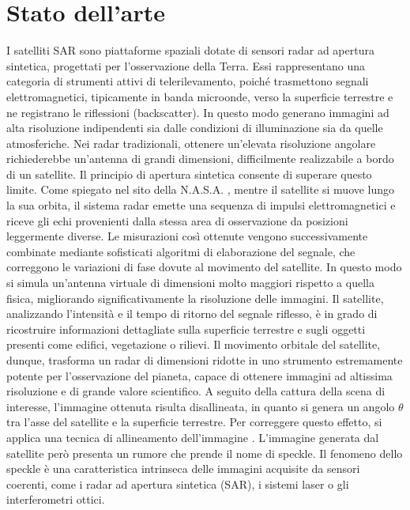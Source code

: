 \chapter{Stato dell'arte}
I satelliti SAR sono piattaforme spaziali dotate di sensori radar ad apertura sintetica, 
progettati per l’osservazione della Terra. Essi rappresentano una categoria di strumenti attivi di telerilevamento, 
poiché trasmettono segnali elettromagnetici, tipicamente in banda microonde, verso la superficie terrestre e ne 
registrano le riflessioni (backscatter). In questo modo generano immagini ad alta risoluzione indipendenti sia 
dalle condizioni di illuminazione sia da quelle atmosferiche.
Nei radar tradizionali, ottenere un’elevata risoluzione angolare richiederebbe un’antenna di grandi dimensioni, 
difficilmente realizzabile a bordo di un satellite. Il principio di apertura sintetica consente di superare questo limite. 
Come spiegato nel sito della N.A.S.A. \cite{nasa_sar}, mentre il satellite si muove lungo la sua orbita, 
il sistema radar emette una sequenza di impulsi elettromagnetici e riceve gli echi provenienti dalla 
stessa area di osservazione da posizioni leggermente diverse.
Le misurazioni così ottenute vengono successivamente combinate mediante sofisticati algoritmi di elaborazione del segnale, 
che correggono le variazioni di fase dovute al movimento del satellite. In questo modo si simula un’antenna virtuale 
di dimensioni molto maggiori rispetto a quella fisica, migliorando significativamente la risoluzione delle immagini.
Il satellite, analizzando l’intensità e il tempo di ritorno del segnale riflesso, è in grado di ricostruire informazioni 
dettagliate sulla superficie terrestre e sugli oggetti presenti come edifici, vegetazione o rilievi. Il movimento 
orbitale del satellite, dunque, trasforma un radar di dimensioni ridotte in uno strumento estremamente potente per 
l’osservazione del pianeta, capace di ottenere immagini ad altissima risoluzione e di grande valore scientifico.
A seguito della cattura della scena di interesse, l’immagine ottenuta risulta disallineata, 
in quanto si genera un angolo $\theta$ tra l’asse del satellite e la superficie terrestre. 
Per correggere questo effetto, si applica una tecnica di allineamento dell’immagine \cite{HUGHES2020166}.
L'immagine generata dal satellite però presenta un rumore che prende il nome di speckle.   
Il fenomeno dello speckle è una caratteristica intrinseca delle immagini acquisite da sensori coerenti, 
come i radar ad apertura sintetica (SAR), i sistemi laser o gli interferometri ottici. 
